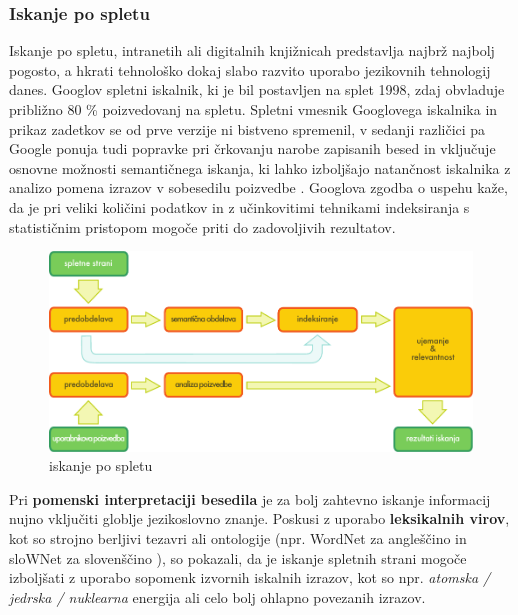 \begin{multicols}{2}
\subsubsection{Iskanje po spletu}

Iskanje po spletu, intranetih ali digitalnih knjižnicah predstav\-lja najbrž naj\-bolj pogosto, a hkrati tehnološko dokaj slabo razvito uporabo jezikovnih tehnologij danes. Googlov spletni iskalnik, ki je bil postav\-ljen na splet 1998, zdaj obvladuje približno 80 \% poizvedovanj na spletu. Spletni vmesnik Googlovega iskalnika in prikaz zadetkov se od prve verzije ni bistveno spremenil, v sedanji različici pa Google ponuja tudi popravke pri črkovanju narobe zapisanih besed in vključuje osnovne možnosti semantičnega iskanja, ki lahko izboljšajo natančnost iskalnika z analizo po\-mena izrazov v sobesedilu poizvedbe \cite{pc1}.  Googlova zgodba o uspehu kaže, da je pri veliki količini podatkov in z učinkovitimi tehnikami indeksiranja s statističnim pristopom mogoče priti do zadovoljivih rezultatov.

\begin{figure}[htb]
  \center
  \includegraphics[width=\textwidth]{../_media/slovene/web_search_architecture}
  \caption{iskanje po spletu}
  \label{fig:websearcharch_de}
\end{figure}

Pri \textbf{pomenski interpretaciji besedila} je za bolj zah\-tevno iskanje informacij nujno vključiti glob\-lje jezikoslovno znanje. Poskusi z uporabo \textbf{leksikalnih virov}, kot so stroj\-no berljivi tezavri ali ontologije (npr. WordNet za angleščino in sloWNet  za slovenščino \cite{slownet1}), so pokazali, da je iskanje spletnih strani mogoče izboljšati z uporabo sopo\-menk izvornih iskalnih izrazov, kot so npr. \textit{atomska / jedrska / nuklearna} energija ali celo bolj ohlapno povezanih izrazov. 


\end{multicols}
